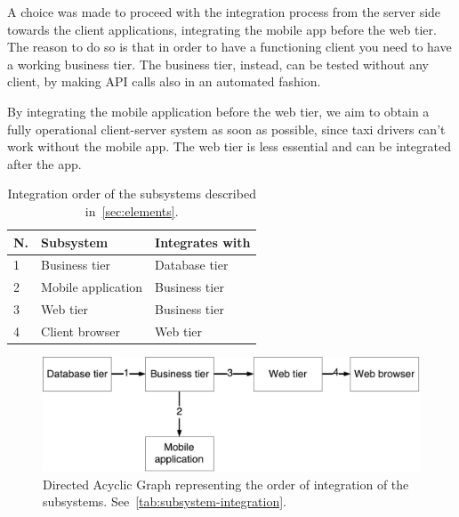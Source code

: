 A choice was made to proceed with the integration process from the server side towards the client applications, integrating the mobile app before the web tier.
The reason to do so is that in order to have a functioning client you need to have a working business tier.
The business tier, instead, can be tested without any client, by making API calls also in an automated fashion.

By integrating the mobile application before the web tier, we aim to obtain a fully operational client-server system as soon as possible, since taxi drivers can't work without the mobile app.
The web tier is less essential and can be integrated after the app.

\begin{table}
    \centering
    \begin{tabular}{| l | l | l |}
        \hline
        \textbf{N.} & \textbf{Subsystem} & \textbf{Integrates with} \\
        \hline
        1 & Business tier & Database tier\\
        2 & Mobile application & Business tier\\
        3 & Web tier & Business tier\\
        4 & Client browser & Web tier\\
        \hline
    \end{tabular}
    \caption{Integration order of the subsystems described in~\autoref{sec:elements}.}
    \label{tab:subsystem-integration}
\end{table}

\begin{figure}
    \centering
    \includegraphics[width=\textwidth]{figures/subsystems_integration_dag.pdf}
    \caption{Directed Acyclic Graph representing the order of integration of the subsystems. See~\autoref{tab:subsystem-integration}.}
    \label{fig:subsystem-integration}
\end{figure}
